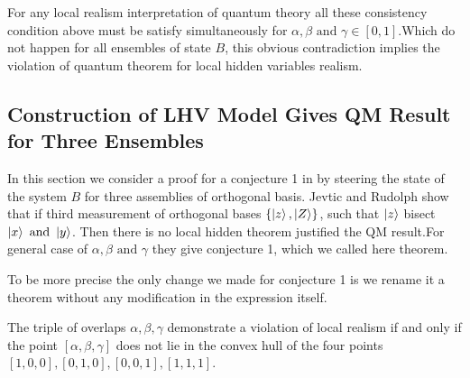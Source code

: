 For any local realism interpretation of quantum theory all these consistency condition above must be satisfy simultaneously for $\alpha, \beta \text{ and } \gamma \in [0,1]$.Which do not happen for all ensembles of state $B$, this obvious contradiction implies the violation of quantum theorem for local hidden variables realism.
\subsection{Construction of LHV Model Gives QM  Result for Three Ensembles}\hfill \break
In this section we consider a proof for a conjecture 1  in\citep*{Jevtic:2015:10.1364/JOSAB.32.000A50} by steering the state of the system $B$ for three assemblies of orthogonal basis.
Jevtic and Rudolph  show that if third measurement  of orthogonal bases $\{\ket{z},\ket{Z}\}$, such that $\ket{z}$ bisect $\ket{x} \text{ and } \ket{y}$. Then there is no local hidden theorem justified the QM result.For general case of $\alpha, \beta \text{ and } \gamma $ they give conjecture 1, which we called here theorem.

To be more precise the only change we made for  conjecture 1 is we rename it a theorem without any modification in the expression itself.



\begin{theorem}
The triple of overlaps $\alpha,\beta, \gamma$ demonstrate a violation of local realism if and only if the point $[\alpha,\beta, \gamma]$ does not lie in the convex hull of the four points
$[1, 0, 0], [0, 1, 0], [0, 0, 1], [1, 1, 1]$.
\end{theorem}

